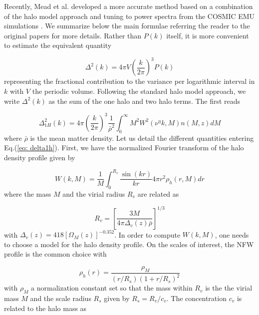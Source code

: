 Recently, Mead et al. \cite{Mead15,Mead16} developed a more accurate method based on a combination of the halo model approach \cite{Sel00,PS00,CS02} and tuning to power spectra from the COSMIC EMU simulations \cite{Heit10,Heit14}. We summarize below the main formulae referring the reader to the original papers for more details. Rather than $P(k)$ itself, it is more convenient to estimate the equivalent quantity

\begin{displaymath}
\Delta^2(k) = 4 \pi V \left ( \frac{k}{2 \pi} \right )^3 P(k)
\end{displaymath}
representing the fractional contribution to the variance per logarithmic interval in $k$ with $V$ the periodic volume. Following the standard halo model approach, we write $\Delta^2(k)$ as the sum of the one halo and two halo terms. The first reads

\begin{equation}
\Delta_{1H}^2(k) = 4 \pi \left ( \frac{k}{2 \pi} \right )^{3} \frac{1}{\bar{\rho}^2} \int_{0}^{\infty}{M^2 W^2(\nu^\eta k, M) n(M, z) dM} 
\label{eq: delta1h}
\end{equation}
where $\bar{\rho}$ is the mean matter density. Let us detail the different quantities entering Eq.(\ref{eq: delta1h}). First, we have the normalized Fourier transform of the halo density profile given by

\begin{equation}
W(k, M) = \frac{1}{M} \int_{0}^{R_v}{\frac{\sin{(kr)}}{kr} 4 \pi r^2 \rho_{h}(r, M) dr}
\label{eq: fthalo}
\end{equation}
where the mass $M$ and the virial radius $R_v$ are related as

\begin{equation}
R_v = \left [ \frac{3M}{4 \pi \Delta_v(z) \bar{\rho}} \right ]^{1/3}
\label{eq: rvm}
\end{equation}
with $\Delta_v(z) = 418 [\Omega_M(z)]^{-0.352}$. In order to compute $W(k, M)$, one needs to choose a model for the halo density profile. On the scales of interest, the NFW profile \cite{NFW96,NFW97} is the common choice with 

\begin{equation}
\rho_h(r) = \frac{\rho_M}{(r/R_s) ( 1+ r/R_s)^2}
\label{eq: nfw}
\end{equation}
with $\rho_M$ a normalization constant set so that the mass within $R_v$ is the the virial mass $M$ and the scale radius $R_s$ given by $R_s = R_v/c_v$. The concentration $c_v$ is related to the halo mass as

